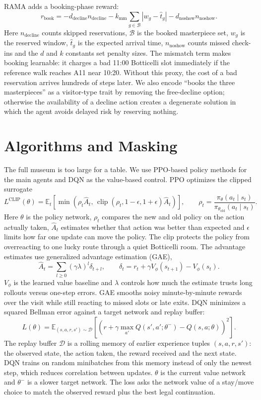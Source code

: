 \documentclass[11pt]{article}
\newcommand{\E}{\mathbb{E}}
\newcommand{\added}[1]{{\color{green!50!black}#1}}
\newenvironment{addedblock}{\begingroup\color{green!50!black}}{\endgroup}
\begin{document}
RAMA adds a booking-phase reward:
\[
r_{\text{book}} =
-d_{\text{decline}}n_{\text{decline}}
-k_{\text{mm}}\sum_{g\in \mathcal{B}} |w_g-\hat t_g|
-d_{\text{noshow}}n_{\text{noshow}}.
\]
Here $n_{\text{decline}}$ counts skipped reservations, $\mathcal B$ is the booked masterpiece set,
$w_g$ is the reserved window, $\hat t_g$ is the expected arrival time, $n_{\text{noshow}}$ counts
missed check-ins and the $d$ and $k$ constants set penalty sizes. The mismatch term makes booking
learnable: it charges a bad 11:00 Botticelli slot immediately if the reference walk reaches A11 near
10:20. Without this proxy, the cost of a bad reservation arrives hundreds of steps later.
\added{We also encode ``books the three masterpieces'' as a visitor-type trait by removing the
free-decline option;} otherwise the availability of a decline action creates a degenerate solution in
which the agent avoids delayed risk by reserving nothing.

\section{Algorithms and Masking}

The full museum is too large for a table. We use PPO-based policy methods for the main agents
and DQN as the value-based control. PPO optimizes the clipped surrogate
\[
L^{\text{CLIP}}(\theta)=
\E_t\left[
\min\left(\rho_t\hat A_t,\,
\operatorname{clip}(\rho_t,1-\epsilon,1+\epsilon)\hat A_t\right)
\right],
\qquad
\rho_t=\frac{\pi_\theta(a_t\mid s_t)}
{\pi_{\theta_{\text{old}}}(a_t\mid s_t)}.
\]
\added{Here $\theta$ is the policy network, $\rho_t$ compares the new and old policy on the action
actually taken, $\hat A_t$ estimates whether that action was better than expected and $\epsilon$ limits
how far one update can move the policy. The clip protects the policy from overreacting to one lucky
route through a quiet Botticelli room.}
\begin{addedblock}
The advantage estimates use generalized advantage estimation (GAE),
\[
\hat A_t=\sum_{l\ge0}(\gamma\lambda)^l\delta_{t+l},
\qquad
\delta_t=r_t+\gamma V_\phi(s_{t+1})-V_\phi(s_t).
\]
$V_\phi$ is the learned value baseline and $\lambda$ controls how much the estimate trusts long
rollouts versus one-step errors. GAE smooths noisy minute-by-minute rewards over the visit while
still reacting to missed slots or late exits.
\end{addedblock}
DQN minimizes a squared Bellman error against a target network and replay buffer:
\[
L(\theta)=\E_{(s,a,r,s')\sim\mathcal{D}}
\left[
\left(r+\gamma\max_{a'}Q(s',a';\theta^-)-Q(s,a;\theta)\right)^2
\right].
\]
\added{The replay buffer $\mathcal D$ is a rolling memory of earlier experience tuples
$(s,a,r,s')$: the observed state, the action taken, the reward received and the next state. DQN trains
on random minibatches from this memory instead of only the newest step, which reduces correlation
between updates. $\theta$ is the current value network and $\theta^-$ is a slower target network. The
loss asks the network value of a stay/move choice to match the observed reward plus the best legal
continuation.}
\end{document}
